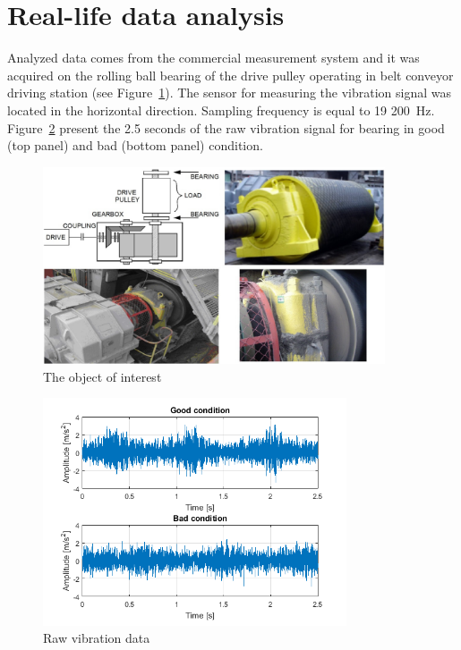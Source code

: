 \documentclass[11pt]{article}
\begin{document}
\section{Real-life data analysis}

Analyzed data comes from the commercial measurement system and it was acquired on the rolling ball bearing of the drive pulley operating in belt conveyor driving station (see Figure~\ref{f:rl}). The sensor for measuring the vibration signal was located in the horizontal direction. Sampling frequency is equal to 19 200~Hz. Figure~\ref{f:raw} present the 2.5 seconds of the raw vibration signal for bearing in good (top panel) and bad (bottom panel) condition.  


\begin{figure}[!ht]
\begin{center}
\includegraphics[width=0.9\textwidth]{gb.PNG}
\caption{The object of interest \label{f:rl}}
\end{center}
\end{figure}

\begin{figure}[!ht]
\begin{center}
\includegraphics[width=0.8\textwidth]{fig2.png}
\caption{Raw vibration data \label{f:raw}}
\end{center}
\end{figure}
\end{document}
